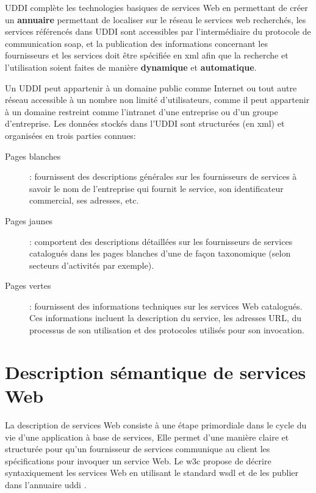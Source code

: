   \textsc{UDDI} complète les technologies basiques de services Web en
  permettant de créer un \textbf{annuaire} permettant de localiser sur
  le réseau le services web recherchés, les services référencés dans
  \textsc{UDDI} sont accessibles par l'intermédiaire du protocole de
  communication \acrshort{soap}, et la publication des informations
  concernant les fournisseurs et les services doit être spécifiée en
  \acrshort{xml} afin que la recherche et l'utilisation soient faites de
  manière \textbf{dynamique} et \textbf{automatique}.\medskip

  Un \textsc{UDDI} peut appartenir à un domaine public comme Internet
  ou tout autre réseau accessible à un nombre non limité
  d'utilisateurs, comme il peut appartenir à un domaine restreint
  comme l'intranet d'une entreprise ou d'un groupe d'entreprise. Les
  données stockés dans l'\textsc{UDDI} sont structurées (en
  \acrshort{xml}) et organisées en trois parties connues:

  \SpecialItem
  \renewcommand{\descriptionlabel}[1]{\hspace{0.5cm}\texttt{#1}}
  \begin{description}
    \item[Pages blanches]: fournissent des descriptions générales sur
      les fournisseurs de services à savoir le nom de l'entreprise qui
      fournit le service, son identificateur commercial, ses adresses,
      etc.

    \item[Pages jaunes]: comportent des descriptions détaillées sur
      les fournisseurs de services catalogués dans les pages blanches
      d'une de façon taxonomique (selon secteurs d'activités par
      exemple).

    \item[Pages vertes]: fournissent des informations techniques sur
      les services Web catalogués. Ces informations incluent la
      description du service, les adresses \textsc{URL}, du processus
      de son utilisation et des protocoles utilisés pour son
      invocation.
  \end{description}

\section{Description sémantique de services Web}
\label{sec:ws-description}

La description de services Web consiste à une étape primordiale dans
le cycle du vie d'une application à base de services, Elle permet
d'une manière claire et structurée pour qu'un fournisseur de services
communique au client les spécifications pour invoquer un service
Web. Le \acrshort{w3c} propose de décrire syntaxiquement les services
Web en utilisant le standard \acrshort{wsdl} \cite{christensen2001web,
  chinnici2007web} et de les publier dans l'annuaire \acrshort{uddi}
\cite{clement2004uddi}.

